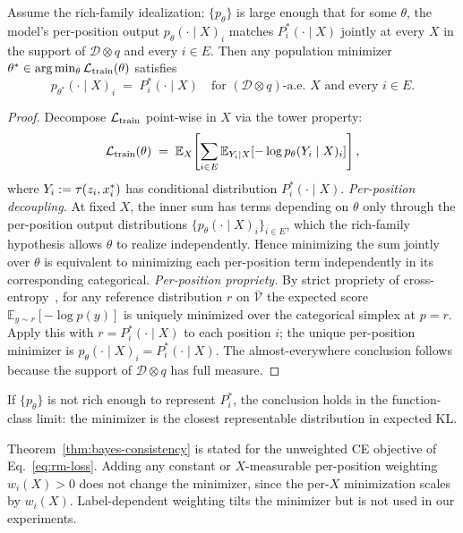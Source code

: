 \begin{theorem}
\label{thm:bayes-consistency}
Assume the rich-family idealization: $\{p_\theta\}$ is large enough that for some $\theta$, the model's per-position output $p_\theta(\cdot \mid X)_i$ matches $P^*_i(\cdot \mid X)$ jointly at every $X$ in the support of $\mathcal{D} \otimes q$ and every $i \in E$. Then any population minimizer $\theta^* \in \arg\min_\theta \mathcal{L}_{\mathrm{train}}(\theta)$ satisfies
\[
p_{\theta^*}(\cdot \mid X)_i \;=\; P^*_i(\cdot \mid X) \quad \text{for } (\mathcal{D} \otimes q)\text{-a.e.\ } X \text{ and every } i \in E.
\]
\end{theorem}

\begin{proof}
Decompose $\mathcal{L}_{\mathrm{train}}$ point-wise in $X$ via the tower property:
\[
\mathcal{L}_{\mathrm{train}}(\theta) \;=\; \mathbb{E}_X\!\left[\sum_{i \in E} \mathbb{E}_{Y_i \mid X}\!\left[-\log p_\theta(Y_i \mid X)_i\right]\right],
\]
where $Y_i := \tau(z_i, x^{\ast}_i)$ has conditional distribution $P^*_i(\cdot \mid X)$. \emph{Per-position decoupling.} At fixed $X$, the inner sum has terms depending on $\theta$ only through the per-position output distributions $\{p_\theta(\cdot \mid X)_i\}_{i \in E}$, which the rich-family hypothesis allows $\theta$ to realize independently. Hence minimizing the sum jointly over $\theta$ is equivalent to minimizing each per-position term independently in its corresponding categorical. \emph{Per-position propriety.} By strict propriety of cross-entropy~\cite{gneiting2007strictly}, for any reference distribution $r$ on $\bar{\mathcal{V}}$ the expected score $\mathbb{E}_{y \sim r}[-\log p(y)]$ is uniquely minimized over the categorical simplex at $p = r$. Apply this with $r = P^*_i(\cdot \mid X)$ to each position $i$; the unique per-position minimizer is $p_\theta(\cdot \mid X)_i = P^*_i(\cdot \mid X)$. The almost-everywhere conclusion follows because the support of $\mathcal{D} \otimes q$ has full measure.
\end{proof}

\begin{remark}
If $\{p_\theta\}$ is not rich enough to represent $P^*_i$, the conclusion holds in the function-class limit: the minimizer is the closest representable distribution in expected KL.
\end{remark}

\begin{remark}
Theorem~\ref{thm:bayes-consistency} is stated for the unweighted CE objective of Eq.~\eqref{eq:rm-loss}. Adding any constant or $X$-measurable per-position weighting $w_i(X) > 0$ does not change the minimizer, since the per-$X$ minimization scales by $w_i(X)$. Label-dependent weighting tilts the minimizer but is not used in our experiments.
\end{remark}

